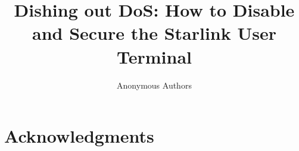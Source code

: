 \documentclass[conference]{IEEEtran}
\begin{document}
\title{Dishing out DoS: How to Disable\\and Secure the Starlink User Terminal}

\author{Anonymous Authors}

\begin{comment}
\author{\IEEEauthorblockN{Joshua Smailes}
\IEEEauthorblockA{University of Oxford\\
joshua.smailes@cs.ox.ac.uk}
\and
\IEEEauthorblockN{Edd Salkield}
\IEEEauthorblockA{University of Oxford\\
edd.salkield@cs.ox.ac.uk}
\and
\IEEEauthorblockN{Simon Birnbach}
\IEEEauthorblockA{University of Oxford\\
simon.birnbach@cs.ox.ac.uk}
\and
\IEEEauthorblockN{Martin Strohmeier}
\IEEEauthorblockA{Cyber-Defence Campus, armasuisse Science + Technology\\
martin.strohmeier@armasuisse.ch}
\and
\IEEEauthorblockN{Ivan Martinovic}
\IEEEauthorblockA{University of Oxford\\
ivan.martinovic@cs.ox.ac.uk}}
\end{comment}

\begin{comment}
\IEEEoverridecommandlockouts
\makeatletter\def\@IEEEpubidpullup{6.5\baselineskip}\makeatother
\IEEEpubid{\parbox{\columnwidth}{
    Network and Distributed System Security (NDSS) Symposium 2023\\
    28 February - 4 March 2023, San Diego, CA, USA\\
    ISBN 1-891562-83-5\\
    https://dx.doi.org/10.14722/ndss.2023.23xxx\\
    www.ndss-symposium.org
}
\hspace{\columnsep}\makebox[\columnwidth]{}}
\end{comment}

\maketitle










\section*{Acknowledgments}
\end{document}
